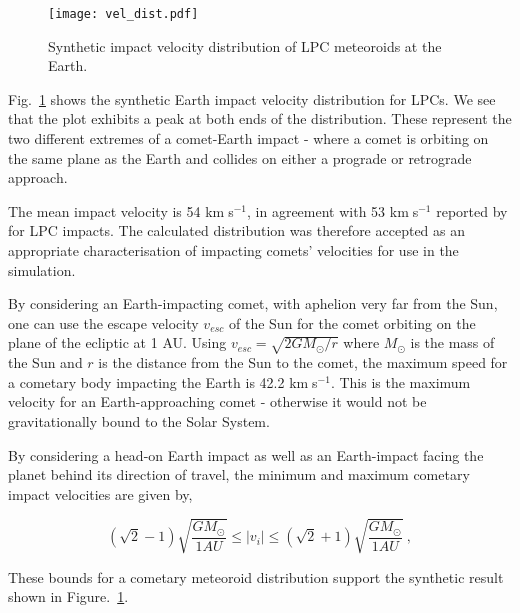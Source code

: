\begin{figure}[t!]
    \centering
    \texttt{[image: vel\_dist.pdf]}
    \caption[Velocity distribution of Earth-impacting cometary meteoroids]{Synthetic impact velocity distribution of LPC meteoroids at the Earth.}
    \label{fig:vel_dis}
\end{figure}

Fig.~\ref{fig:vel_dis} shows the synthetic Earth impact velocity distribution for LPCs. We see that the plot exhibits a peak at both ends of the distribution. These represent the two different extremes of a comet-Earth impact - where a comet is orbiting on the same plane as the Earth and collides on either a prograde or retrograde approach. 

The mean impact velocity is 54 km$\;$s$^{-1}$, in agreement with 53 km$\;$s$^{-1}$ reported by \cite{1988merc.book..274S} for LPC impacts. The calculated distribution was therefore accepted as an appropriate characterisation of impacting comets' velocities for use in the simulation.

By considering an Earth-impacting comet, with aphelion very far from the Sun, one can use the escape velocity $v_{esc}$ of the Sun for the comet orbiting on the plane of the ecliptic at 1 AU. Using $v_{esc}=\sqrt{2GM_{\odot}/r}$ where $M_{\odot}$ is the mass of the Sun and $r$ is the distance from the Sun to the comet, the maximum speed for a cometary body impacting the Earth is 42.2 km$\;$s$^{-1}$. This is the maximum velocity for an Earth-approaching comet - otherwise it would not be gravitationally bound to the Solar System. 

By considering a head-on Earth impact as well as an Earth-impact facing the planet behind its direction of travel, the minimum and maximum cometary impact velocities are given by,

\begin{equation}
    (\sqrt{2}-1) \sqrt{ \dfrac{GM_{\odot}}{1 AU} } \leq |v_i| \leq (\sqrt{2}+1) \sqrt{\dfrac{GM_{\odot}}{1 AU}} ~,
\end{equation}
 
 These bounds for a cometary meteoroid distribution support the synthetic result shown in Figure.~\ref{fig:vel_dis}.


